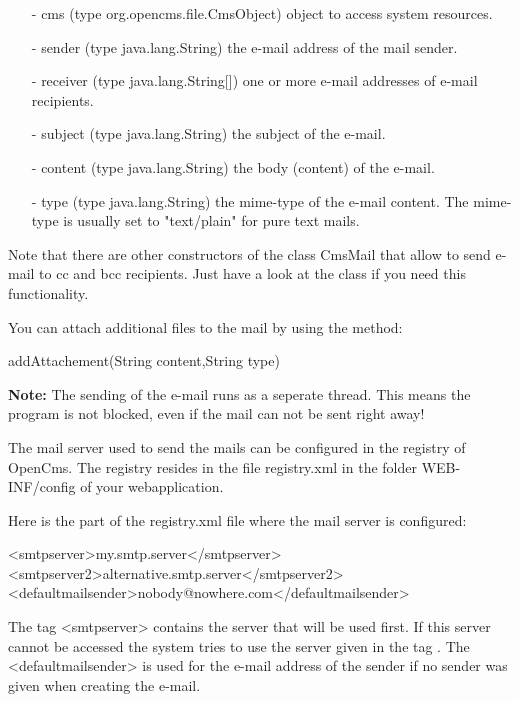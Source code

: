 \begin{itemize}
\item[-] cms (type {\code org.opencms.file.CmsObject}) object to access system resources.
\item[-] sender (type {\code java.lang.String}) the e-mail address of the mail sender.
\item[-] receiver (type {\code java.lang.String[]}) one or more e-mail addresses of e-mail recipients.
\item[-] subject (type {\code java.lang.String}) the subject of the e-mail.
\item[-] content (type {\code java.lang.String}) the body (content) of the e-mail.
\item[-] type (type {\code java.lang.String}) the mime-type of the e-mail content.
The mime-type is usually set to "text/plain" for pure text mails.
\end{itemize}

Note that there are other constructors of the class {\class CmsMail} that allow to send e-mail
to cc and bcc recipients. Just have a look at the class if you need this functionality.

You can attach additional files to the mail by using the method:

{\meth  addAttachement(String content,String type)} 

{\bf Note:} The sending of the e-mail runs as a seperate thread. This means the program is not
blocked, even if the mail can not be sent right away!

The mail server used to send the mails can be configured in the registry of OpenCms.
The registry resides in the file {\name registry.xml} in the folder {\dir WEB-INF/config}
of your webapplication.

Here is the part of the {\name registry.xml} file where the mail server is configured:

\begin{xml}
<smtpserver>my.smtp.server</smtpserver>
<smtpserver2>alternative.smtp.server</smtpserver2>
<defaultmailsender>nobody@nowhere.com</defaultmailsender>
\end{xml}

The tag {\code <smtpserver>} contains the server that will be used first.
If this server cannot be accessed the system tries to use the server given in the tag
{}.
The {\code <defaultmailsender>} is used for the e-mail address of the sender
if no sender was given when creating the e-mail.


